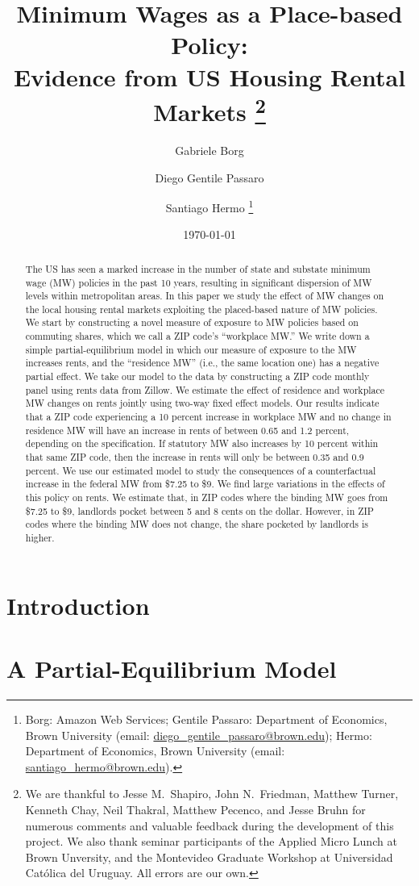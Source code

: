 \documentclass{article}
\title{ Minimum Wages as a Place-based Policy: \\
        Evidence from US Housing Rental Markets
        \thanks{We are thankful to Jesse M.\ Shapiro, John N.\ Friedman, Matthew Turner, 
        Kenneth Chay, Neil Thakral, Matthew Pecenco, and Jesse Bruhn for numerous 
        comments and valuable feedback during the development of this project.
        We also thank seminar participants of the Applied Micro Lunch at Brown
        Unversity, and the Montevideo Graduate Workshop at Universidad Católica del
        Uruguay.
        All errors are our own.}}
\author{Gabriele Borg \and Diego Gentile Passaro \and Santiago Hermo
        \footnote{
        Borg: Amazon Web Services; 
        Gentile Passaro: Department of Economics, Brown University 
        (email: \url{diego_gentile_passaro@brown.edu}); 
        Hermo: Department of Economics, Brown University 
        (email: \url{santiago_hermo@brown.edu}).}}
\date{\today}
\begin{document}
\maketitle

\begin{abstract}
    \noindent
    The US has seen a marked increase in the number of state and substate minimum 
    wage (MW) policies in the past 10 years, resulting in significant dispersion 
    of MW levels within metropolitan areas.
    In this paper we study the effect of MW changes on the local housing rental 
    markets exploiting the placed-based nature of MW policies.
    We start by constructing a novel measure of exposure to MW policies based on 
    commuting shares, which we call a ZIP code's ``workplace MW.''
    We write down a simple partial-equilibrium model in which our measure of 
    exposure to the MW increases rents, and the ``residence MW'' (i.e., the same 
    location one) has a negative partial effect.
    We take our model to the data by constructing a ZIP code monthly panel using 
    rents data from Zillow.
    We estimate the effect of residence and workplace MW changes on rents jointly 
    using two-way fixed effect models.
    Our results indicate that a ZIP code experiencing a 10 percent increase in 
    workplace MW and no change in residence MW will have an increase in rents of 
    between 0.65 and 1.2 percent, depending on the specification.
    If statutory MW also increases by 10 percent within that same ZIP code, then
    the increase in rents will only be between 0.35 and 0.9 percent.
    We use our estimated model to study the consequences of a counterfactual
    increase in the federal MW from \$7.25 to \$9.
    We find large variations in the effects of this policy on rents.
    We estimate that, in ZIP codes where the binding MW goes from \$7.25 to \$9,
    landlords pocket between 5 and 8 cents on the dollar.
    However, in ZIP codes where the binding MW does not change, the share pocketed
    by landlords is higher.
\end{abstract}

\vspace{5mm}


\clearpage

\section{Introduction}\label{sec:intro}
    

\section{A Partial-Equilibrium Model}\label{sec:model}
    
\end{document}
